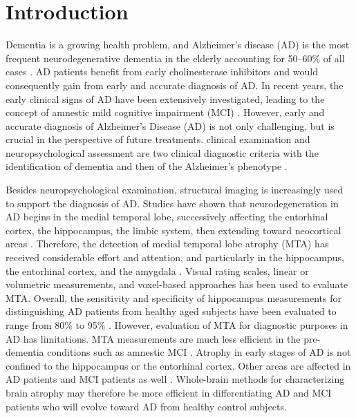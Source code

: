 


\section{Introduction}

Dementia is a growing health problem, and Alzheimer’s disease (AD) is the most frequent neurodegenerative dementia in the elderly accounting for 50–60\% of all cases \cite{brookmeyer1998projections,ferri2006global,ramaroson2003prevalence}. AD patients benefit from early cholinesterase inhibitors \cite{winblad1999assessing,dekosky2003looking} and would consequently gain from early and accurate diagnosis of AD. In recent years, the early clinical signs of AD have been extensively investigated, leading to the concept of amnestic
mild cognitive impairment (MCI) \cite{petersen2004mild,winblad2004mild}. However, early and accurate diagnosis of Alzheimer's Disease (AD) is not only challenging, but is crucial in the perspective of future treatments. clinical examination and neuropsychological assessment are two clinical diagnostic criteria with the identification of dementia and then of the Alzheimer's phenotype \cite{glodzik2012alzheimer}.

Besides neuropsychological examination, structural imaging is increasingly used to support the diagnosis of AD. Studies have shown that neurodegeneration in AD begins in the medial temporal lobe, successively affecting the entorhinal cortex, the hippocampus, the limbic system, then extending toward neocortical areas \cite{braak1995staging}. Therefore, the detection of medial temporal lobe atrophy (MTA) has received considerable effort and attention, and particularly in the hippocampus, the entorhinal cortex, and the amygdala \cite{leite2004pathological,glodzik2005role}. Visual rating scales, linear or volumetric measurements, and voxel-based approaches has been used to evaluate MTA. Overall, the sensitivity and specificity of hippocampus measurements for distinguishing AD patients from healthy aged subjects have been evaluated to range from 80\% to 95\% \cite{xu2000usefulness,frisoni1999hippocampal,laakso1998mri,lehericy1994amygdalohippocampal,jack1992mr}. However, evaluation of MTA for diagnostic purposes in AD has limitations. MTA measurements are much less efficient in the pre-dementia conditions such as amnestic MCI \cite{xu2000usefulness,pennanen2004hippocampus,de2001hippocampal,convit1997specific}. Atrophy in early stages of AD is not confined to the hippocampus or the entorhinal cortex. Other areas are affected in AD patients and MCI patients as well \cite{ael2003early}. Whole-brain methods for characterizing brain atrophy may therefore be more efficient in differentiating AD and MCI patients who will evolve toward AD from healthy control subjects. 


